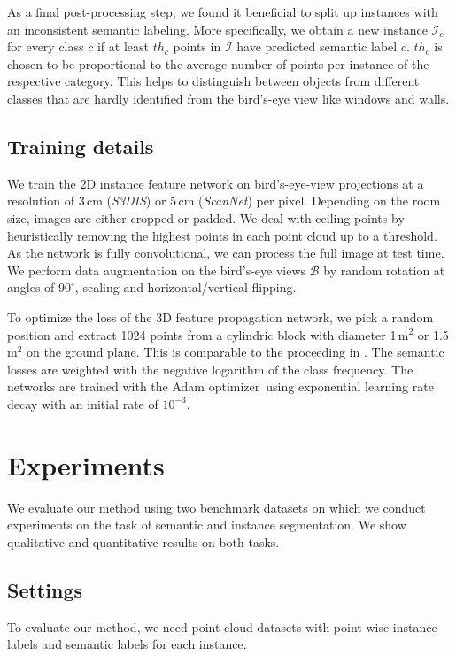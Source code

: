 \documentclass[runningheads]{llncs}
\begin{document}
{As a final post-processing step, we found it beneficial to split up instances with an inconsistent semantic labeling. 
More specifically, we obtain a new instance $\mathcal{I}_c$ for every class $c$ if at least $th_c$ points in $\mathcal{I}$ have predicted semantic label $c$. $th_c$ is chosen to be proportional to the average number of points per instance of the respective category.
This helps to distinguish between objects from different classes that are hardly identified from the bird's-eye view like windows and walls.


\subsection{Training details}
We train the 2D instance feature network on bird's-eye-view projections at a resolution of 3\,cm (\textit{S3DIS}) or 5\,cm (\textit{ScanNet}) per pixel. Depending on the room size, images are either cropped or padded.
We deal with ceiling points by heuristically removing the highest points in each point cloud up to a threshold.
As the network is fully convolutional, we can process the full image at test time.
We perform data augmentation on the bird's-eye views $\mathcal{B}$ by random rotation at angles of $90^{\circ}$, scaling and horizontal/vertical flipping.

To optimize the loss of the 3D feature propagation network, we pick a random position and extract 1024 points from a cylindric block with diameter 1\,m$^2$ or 1.5\,m$^2$ on the ground plane. This is comparable to the proceeding in \cite{Qi17CVPR,Wang18CoRR}. The semantic losses are weighted with the negative logarithm of the class frequency.
The networks are trained with the Adam optimizer\,\cite{Kingma15ICLR} using exponential learning rate decay with an initial rate of $10^{-3}$.

 


\section{Experiments}
We evaluate our method using two benchmark datasets on which we conduct experiments on the task of semantic and instance segmentation.
We show qualitative and quantitative results on both tasks.

\subsection{Settings}
To evaluate our method, we need point cloud datasets with point-wise instance labels and semantic labels for each instance.

}
\end{document}
